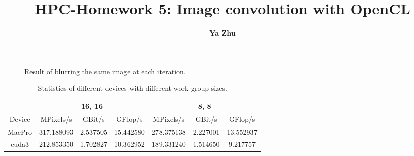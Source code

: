\documentclass[11pt, oneside]{article}   	%
\title{\bf HPC-Homework 5: Image convolution with OpenCL}
\author{\bf \large Ya Zhu}
\date{}							%
\begin{document}
\maketitle 
\section{}
\begin{figure}[ht]\label{fig:1}
\centering
{}
\caption{Result of blurring the same image at each iteration.}
\end{figure}
\begin{table}[h]
\centering
\caption{Statistics of different devices with different work group sizes.}
\label{tbl:1}
\begin{tabular}{|c|c|c|c|c|c|c|}
\hline
       & \multicolumn{3}{c|}{16, 16} & \multicolumn{3}{c|}{8, 8} \\ \hline
Device &    MPixels/s     &   GBit/s      &   GFlop/s      &    MPixels/s     &  GBit/s      &   GFlop/s     \\ \hline
MacPro &    317.188093     &    2.537505     &    15.442580     &    278.375138     &    2.227001    &  13.552937      \\ \hline
cuda3  &    212.853350     &   1.702827      &   10.362952      &  189.331240       &   1.514650     &   9.217757     \\ \hline
\end{tabular}
\end{table}
\end{document}

